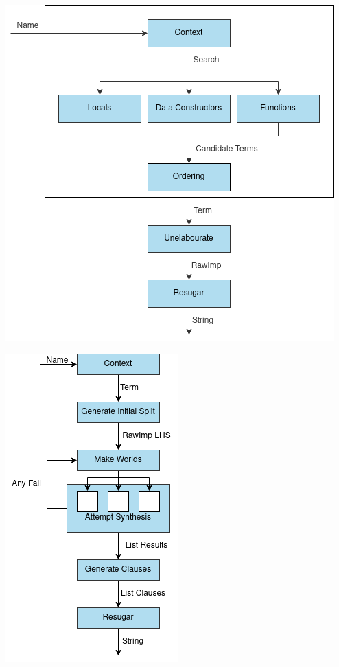 \documentclass[a4paper]{article}
\newenvironment{Figure}
  {\par\medskip\noindent\minipage{\linewidth}}
  {\endminipage\par\medskip}
\begin{document}
\begin{multicols}{2}
\begin{Figure}
\centering
\includegraphics[scale=0.55]{./Resource/syn.png}
\end{Figure}

\begin{Figure}
\centering
\includegraphics[scale=0.6]{./Resource/worlds.png}
\end{Figure}
\end{multicols}
\end{document}
